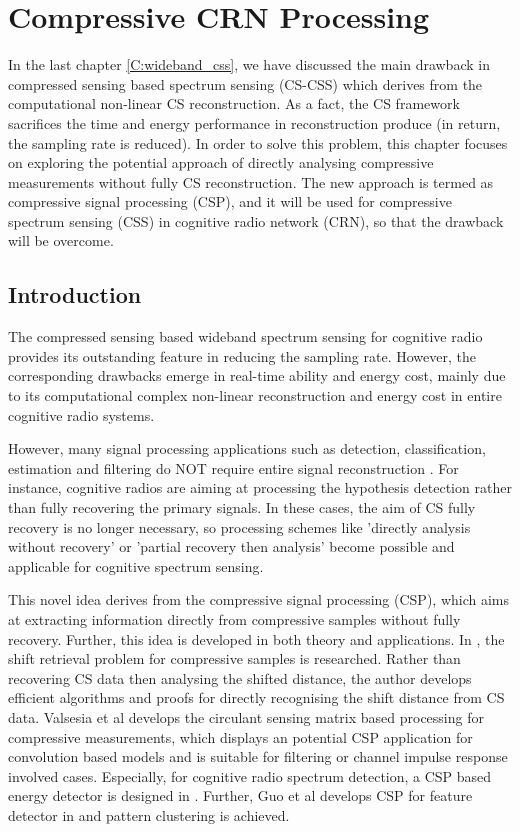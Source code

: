 \chapter{Compressive CRN Processing} 
\label{C:csp_css}

\indent \indent In the last chapter \ref{C:wideband_css}, we have discussed the main drawback in compressed sensing based spectrum sensing (CS-CSS) which derives from the computational non-linear CS reconstruction. As a fact, the CS framework sacrifices the time and energy performance in reconstruction produce (in return, the sampling rate is reduced). In order to solve this problem, this chapter focuses on exploring the potential approach of directly analysing compressive measurements without fully CS reconstruction. The new approach is termed as compressive signal processing (CSP), and it will be used for compressive spectrum sensing (CSS) in cognitive radio network (CRN), so that the drawback will be overcome. 

\section{Introduction}

\indent \indent The compressed sensing based wideband spectrum sensing for cognitive radio provides its outstanding feature in reducing the sampling rate. However, the corresponding drawbacks emerge in real-time ability and energy cost, mainly due to its computational complex non-linear reconstruction and energy cost in entire cognitive radio systems.  

However, many signal processing applications such as detection, classification, estimation and filtering do NOT require entire signal reconstruction \cite{davenport2010signal}. For instance, cognitive radios are aiming at processing the hypothesis detection rather than fully recovering the primary signals. In these cases, the aim of CS fully recovery is no longer necessary, so processing schemes like 'directly analysis without recovery' or 'partial recovery then analysis' become possible and applicable for cognitive spectrum sensing. 

This novel idea derives from the compressive signal processing (CSP)\cite{davenport2010signal}, which aims at extracting information directly from compressive samples without fully recovery. Further, this idea is developed in both theory and applications. In \cite{ohlsson2013compressive}, the shift retrieval problem for compressive samples is researched. Rather than recovering CS data then analysing the shifted distance, the author develops efficient algorithms and proofs for directly recognising the shift distance from CS data. Valsesia et al \cite{valsesia2014compressive} develops the circulant sensing matrix based processing for compressive measurements, which displays an potential CSP application for convolution based models and is suitable for filtering or channel impulse response involved cases. Especially, for cognitive radio spectrum detection, a CSP based energy detector is designed in \cite{appaiah2013spectrum}. Further, Guo et al develops CSP for feature detector in \cite{guo2013feature} and pattern clustering is achieved.

